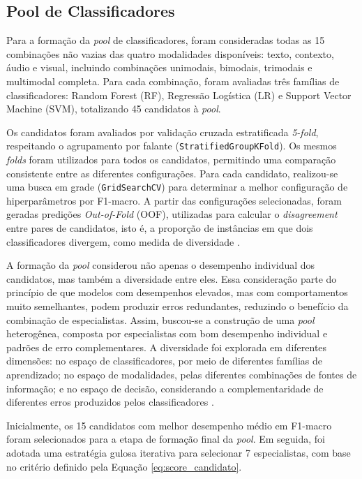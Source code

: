 \documentclass[conference]{IEEEtran}
\begin{document}
\subsection{Pool de Classificadores}

Para a formação da \textit{pool} de classificadores, foram consideradas todas as 15 combinações não vazias das quatro modalidades disponíveis: texto, contexto, áudio e visual, incluindo combinações unimodais, bimodais, trimodais e multimodal completa. Para cada combinação, foram avaliadas três famílias de classificadores: Random Forest (RF), Regressão Logística (LR) e Support Vector Machine (SVM), totalizando 45 candidatos à \textit{pool}.

Os candidatos foram avaliados por validação cruzada estratificada \textit{5-fold}, respeitando o agrupamento por falante (\texttt{StratifiedGroupKFold}). Os mesmos \textit{folds} foram utilizados para todos os candidatos, permitindo uma comparação consistente entre as diferentes configurações. Para cada candidato, realizou-se uma busca em grade (\texttt{GridSearchCV}) para determinar a melhor configuração de hiperparâmetros por F1-macro. A partir das configurações selecionadas, foram geradas predições \textit{Out-of-Fold} (OOF), utilizadas para calcular o \textit{disagreement} entre pares de candidatos, isto é, a proporção de instâncias em que dois classificadores divergem, como medida de diversidade \cite{monteiro2021diversity, kuncheva2003measures}.

A formação da \textit{pool} considerou não apenas o desempenho individual dos candidatos, mas também a diversidade entre eles. Essa consideração parte do princípio de que modelos com desempenhos elevados, mas com comportamentos muito semelhantes, podem produzir erros redundantes, reduzindo o benefício da combinação de especialistas. Assim, buscou-se a construção de uma \textit{pool} heterogênea, composta por especialistas com bom desempenho individual e padrões de erro complementares. A diversidade foi explorada em diferentes dimensões: no espaço de classificadores, por meio de diferentes famílias de aprendizado; no espaço de modalidades, pelas diferentes combinações de fontes de informação; e no espaço de decisão, considerando a complementaridade de diferentes erros produzidos pelos classificadores \cite{britto2014dynamic, monteiro2021diversity}.

Inicialmente, os 15 candidatos com melhor desempenho médio em F1-macro foram selecionados para a etapa de formação final da \textit{pool}. Em seguida, foi adotada uma estratégia gulosa iterativa para selecionar 7 especialistas, com base no critério definido pela Equação \ref{eq:score_candidato}.
\end{document}
